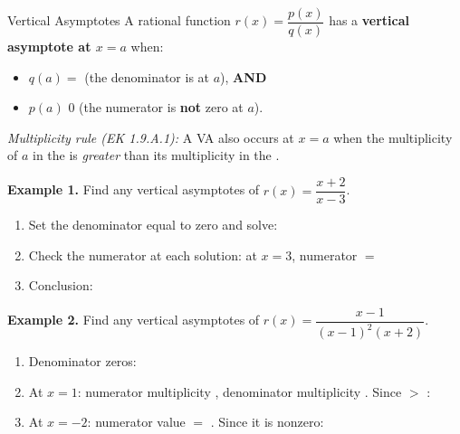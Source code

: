 \documentclass[10pt]{article}
\begin{document}
\begin{notesbox}{Vertical Asymptotes}
A rational function $r(x) = \dfrac{p(x)}{q(x)}$ has a \textbf{vertical asymptote at $x = a$} when:

\begin{itemize}
  \item $q(a) =$  \quad (the denominator is  at $a$), \textbf{AND}
  \item $p(a)$ \ans{$\ne$} $0$ \quad (the numerator is \textbf{not} zero at $a$).
\end{itemize}

\textit{Multiplicity rule (EK 1.9.A.1):} A VA also occurs at $x = a$ when the multiplicity of
$a$ in the  is \emph{greater} than its multiplicity in the .

\medskip
\textbf{Example 1.} Find any vertical asymptotes of $r(x) = \dfrac{x + 2}{x - 3}$.

\begin{enumerate}[label=\textbf{Step \arabic*.}, itemsep=4pt]
  \item Set the denominator equal to zero and solve: 

  \item Check the numerator at each solution: at $x = 3$, numerator $=$ 

  \item Conclusion: 
\end{enumerate}

\medskip
\textbf{Example 2.} Find any vertical asymptotes of $r(x) = \dfrac{x - 1}{(x-1)^2(x+2)}$.

\begin{enumerate}[label=\textbf{Step \arabic*.}, itemsep=4pt]
  \item Denominator zeros: 

  \item At $x = 1$: numerator multiplicity , denominator multiplicity .
        Since  $>$ : 

  \item At $x = -2$: numerator value $=$ . Since it is nonzero: 
\end{enumerate}
\end{notesbox}

\vspace{0.1in}
\end{document}
